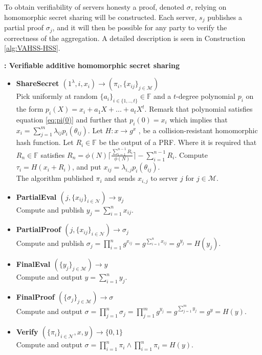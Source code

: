 To obtain verifiability of servers honesty a proof, denoted $\sigma$, relying on homomorphic secret sharing will be constructed. Each server, $s_j$ publishes a partial proof $\sigma_j$, and it will then be possible for any party to verify the correctness of the aggregation. A detailed description is seen in Construction \ref{alg:VAHSS-HSS}.

\begin{algorithm}
\caption{\textbf{: Verifiable additive homomorphic secret sharing}}
\begin{itemize}
  \item\textbf{ShareSecret $(1^\lambda,i,x_i)\xrightarrow[]{}(\pi_i,\{x_{ij}\}_{j\in\mathcal{M}})$}\\
Pick uniformly at random $\{a_i\}_{i\in\{1,..,t\}}\in\mathds{F}$ and a $t$-degree polynomial $p_i$ on the form $p_i(X) = x_i + a_1X+...+a_tX^t$. Remark that polynomial satisfies equation \eqref{eq:pi(0)} and further that $p_i(0)=x_i$  which implies that $x_i =  \sum_{j=1}^m \lambda_{ij}p_i(\theta_{ij})$. Let $H:x\to g^x$
, be a collision-resistant homomorphic hash function. Let $R_i\in\mathds{F}$ be the output of a PRF. Where it is required that  $R_n\in \mathds{F}$  satisfies
$R_n = \phi(N)\lceil \frac{\sum_{i=1}^{n-1}R_i}{\phi(N)}\rceil- \sum_{i=1}^{n-1}R_i $. Compute $\tau_i = H(x_i+R_i)$, and put $x_{ij}=\lambda_{i,j}p_i(\theta_{ij})$. \\
The algorithm published $\pi_i$ and sends $x_{i,j}$ to server $j$ for $j\in\mathcal{M}$. 

\item\textbf{PartialEval $(j,\{x_{ij}\}_{i\in\mathcal{N}})\xrightarrow[]{}y_j$}\\
Compute and publish $y_j = \sum_{i=1}^n x_{ij}$.

\item\textbf{PartialProof $(j,\{x_{ij}\}_{i\in\mathcal{N}})\xrightarrow[]{}\sigma_j$}\\
Compute and publish $\sigma_j = \prod_{i=1}^n g^{x_{ij}} =  g^{\sum_{i=1}^n x_{ij}}= g^{y_j}=H(y_j)$.

\item\textbf{FinalEval $(\{y_j\}_{j\in\mathcal{M}})\xrightarrow[]{}y$}\\
Compute and output $y = \sum_{i=1}^n y_{j}$.

\item\textbf{FinalProof $(\{\sigma_j\}_{j\in\mathcal{M}})\xrightarrow[]{}\sigma$}\\
Compute and output $\sigma = \prod_{j=1}^n \sigma_j = \prod_{j=1}^m g^{y_{j}} =  g^{\sum_{j=1}^m y_{j}}= g^{y}=H(y)$.

\item\textbf{Verify $(\{\pi_i\}_{i\in\mathcal{N}},x,y)\xrightarrow[]{}\{0,1\}$}\\
Compute and output $\sigma= \prod_{i=1}^n \pi_i \wedge \prod_{i=1}^n \pi_i = H(y)$.
\end{itemize}
\label{alg:VAHSS-HSS}
\end{algorithm}



